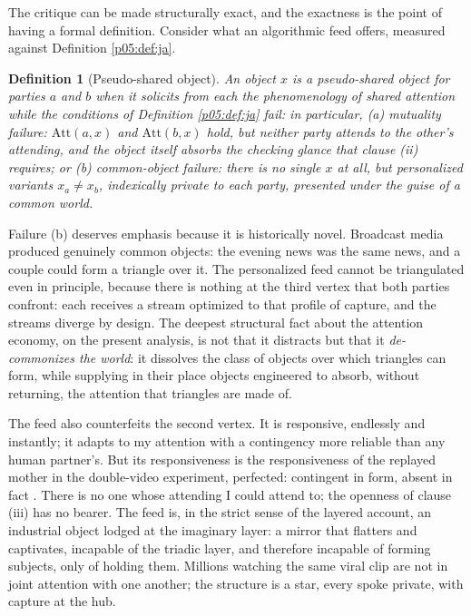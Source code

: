 \documentclass[11pt,a4paper]{article}
\theoremstyle{seriesthm}
\newtheorem{defn}{Definition}
\begin{document}
The critique can be made structurally exact, and the exactness is the point of having a formal definition. Consider what an algorithmic feed offers, measured against Definition \ref{p05:def:ja}.

\begin{defn}[Pseudo-shared object]\label{p05:def:pseudo}
An object $x$ is a pseudo-shared object for parties $a$ and $b$ when it solicits from each the phenomenology of shared attention while the conditions of Definition \ref{p05:def:ja} fail: in particular, (a) mutuality failure: $\mathrm{Att}(a,x)$ and $\mathrm{Att}(b,x)$ hold, but neither party attends to the other's attending, and the object itself absorbs the checking glance that clause (ii) requires; or (b) common-object failure: there is no single $x$ at all, but personalized variants $x_a \neq x_b$, indexically private to each party, presented under the guise of a common world.
\end{defn}

Failure (b) deserves emphasis because it is historically novel. Broadcast media produced genuinely common objects: the evening news was the same news, and a couple could form a triangle over it. The personalized feed cannot be triangulated even in principle, because there is nothing at the third vertex that both parties confront: each receives a stream optimized to that profile of capture, and the streams diverge by design. The deepest structural fact about the attention economy, on the present analysis, is not that it distracts but that it \emph{de-commonizes the world}: it dissolves the class of objects over which triangles can form, while supplying in their place objects engineered to absorb, without returning, the attention that triangles are made of.

The feed also counterfeits the second vertex. It is responsive, endlessly and instantly; it adapts to my attention with a contingency more reliable than any human partner's. But its responsiveness is the responsiveness of the replayed mother in the double-video experiment, perfected: contingent in form, absent in fact \parencite{murray1985}. There is no one whose attending I could attend to; the openness of clause (iii) has no bearer. The feed is, in the strict sense of the layered account, an industrial object lodged at the imaginary layer: a mirror that flatters and captivates, incapable of the triadic layer, and therefore incapable of forming subjects, only of holding them. Millions watching the same viral clip are not in joint attention with one another; the structure is a star, every spoke private, with capture at the hub.
\end{document}
